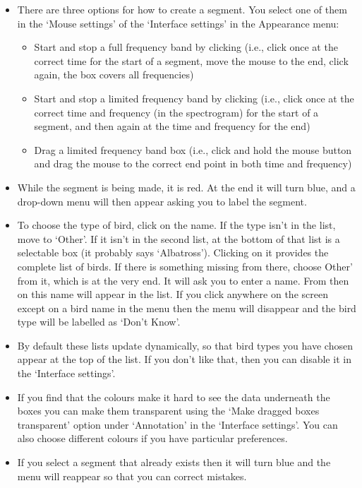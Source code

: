 \documentclass{article}
\begin{document}
\begin{itemize}
\item There are three options for how to create a segment. You select one of them in the `Mouse settings' of the `Interface settings' in the Appearance menu:
	\begin{itemize}
	\item Start and stop a full frequency band by clicking (i.e., click once at the correct time for the start of a segment, move the mouse to the end, click again, the box covers all frequencies)
	\item Start and stop a limited frequency band by clicking (i.e., click once at the correct time and frequency (in the spectrogram) for the start of a segment, and then again at the time and frequency for the end)
	\item Drag a limited frequency band box (i.e., click and hold the mouse button and drag the mouse to the correct end point in both time and frequency)
	\end{itemize}

\item While the segment is being made, it is red. At the end it will turn blue, and a drop-down menu will then appear asking you to label the segment. 

\item To choose the type of bird, click on the name. If the type isn't in the list, move to `Other'. If it isn't in the second list, at the bottom of that list is a selectable box (it probably says `Albatross'). Clicking on it provides the complete list of birds. If there is something missing from there, choose Other' from it, which is at the very end. It will ask you to enter a name. From then on this name will appear in the list. If you click anywhere on the screen except on a bird name in the menu then the menu will disappear and the bird type will be labelled as `Don't Know'. 

\item By default these lists update dynamically, so that bird types you have chosen appear at the top of the list. If you don't like that, then you can disable it in the `Interface settings'. 

\item If you find that the colours make it hard to see the data underneath the boxes you can make them transparent using the `Make dragged boxes transparent' option under `Annotation' in the `Interface settings'. You can also choose different colours if you have particular preferences.

\item If you select a segment that already exists then it will turn blue and the menu will reappear so that you can correct mistakes.


\end{itemize}
\end{document}
